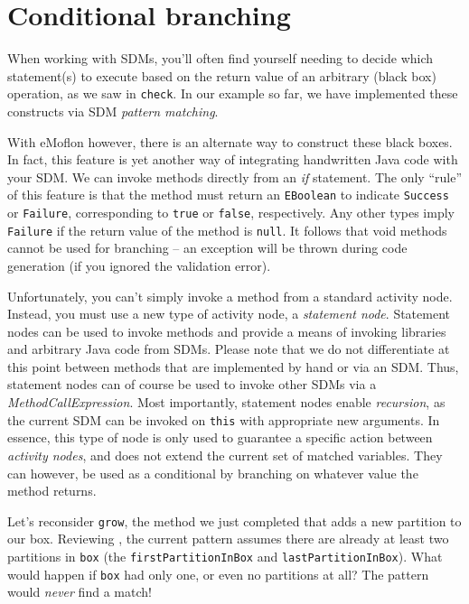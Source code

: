 \newpage
\hypertarget{sec:conBran}{}
\chapter{Conditional branching}
\genHeader

When working with SDMs, you'll often find yourself needing to decide which statement(s) to execute based on the return value of an arbitrary (black box)
operation, as we saw in \texttt{check}. In our example so far, we have implemented these constructs via SDM \emph{pattern matching}. 

With eMoflon however, there is an alternate way to construct these black boxes.
In fact, this feature is yet another way of integrating handwritten Java code with your SDM. We can invoke methods directly from an \emph{if} statement. The only ``rule'' of this feature is that the method must return an
\texttt{EBoolean} to indicate \texttt{Success} or \texttt{Failure}, corresponding to \texttt{true} or \texttt{false}, respectively. Any other types imply
\texttt{Failure} if the return value of the method is \texttt{null}. It follows that void methods cannot be used for branching -- an exception will be thrown
during code generation (if you ignored the validation error).

Unfortunately, you can't simply invoke a method from a standard activity node. Instead, you must use a new type of activity node, a \emph{statement
node}. Statement nodes can be used to invoke methods and provide a means of invoking libraries and
arbitrary Java code from SDMs. Please note that we do not differentiate at this point between methods that are implemented by hand or via an SDM. Thus,
statement nodes can of course be used to invoke other SDMs via a \emph{MethodCallExpression}. Most importantly, statement nodes enable \emph{recursion}, as the
current SDM can be invoked on \texttt{this} with appropriate new arguments. In essence, this type of node is only used to guarantee a specific action
between \emph{activity nodes}, and does not extend the current set of matched variables. They can however, be used as a conditional by branching on
whatever value the method returns.

Let's reconsider \texttt{grow}, the method we just completed that adds a new partition to our box. Reviewing , the current pattern assumes there are already at least two partitions in \texttt{box} (the
\texttt{firstPartitionInBox} and \texttt{lastPartitionInBox}). What would happen
if \texttt{box} had only one, or even no partitions at all? The pattern would \emph{never} find a match!

